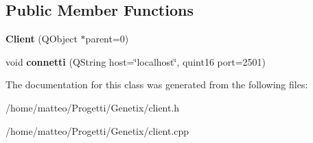 \subsection*{Public Member Functions}
\begin{DoxyCompactItemize}
\item 
\mbox{\label{classClient_a7832757f3fa37f564a21cb2b79b2baad}} 
{\bfseries Client} (Q\+Object $\ast$parent=0)
\item 
\mbox{\label{classClient_a7439b9f4cd0a2d745d60c49c2db55935}} 
void {\bfseries connetti} (Q\+String host=\char`\"{}localhost\char`\"{}, quint16 port=2501)
\end{DoxyCompactItemize}


The documentation for this class was generated from the following files\+:\begin{DoxyCompactItemize}
\item 
/home/matteo/\+Progetti/\+Genetix/client.\+h\item 
/home/matteo/\+Progetti/\+Genetix/client.\+cpp\end{DoxyCompactItemize}
